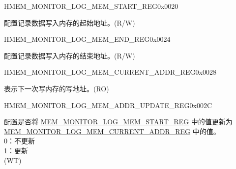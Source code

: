 \begin{register}{H}{MEM\_MONITOR\_LOG\_MEM\_START\_REG}{0x0020}\label{regdesc:MEMMONITORLOGMEMSTARTREG}
%
\regnewline%
\begin{regdesc}\begin{reglist}
\label{fielddesc:MEMMONITORLOGMEMSTART}\item [MEM\_MONITOR\_LOG\_MEM\_START] 配置记录数据写入内存的起始地址。(R/W)
\end{reglist}\end{regdesc}
\end{register}


\begin{register}{H}{MEM\_MONITOR\_LOG\_MEM\_END\_REG}{0x0024}\label{regdesc:MEMMONITORLOGMEMENDREG}
%
\regnewline%
\begin{regdesc}\begin{reglist}
\label{fielddesc:MEMMONITORLOGMEMEND}\item [MEM\_MONITOR\_LOG\_MEM\_END] 配置记录数据写入内存的结束地址。(R/W)
\end{reglist}\end{regdesc}
\end{register}


\begin{register}{H}{MEM\_MONITOR\_LOG\_MEM\_CURRENT\_ADDR\_REG}{0x0028}\label{regdesc:MEMMONITORLOGMEMCURRENTADDRREG}
%
\regnewline%
\begin{regdesc}\begin{reglist}
\label{fielddesc:MEMMONITORLOGMEMCURRENTADDR}\item [MEM\_MONITOR\_LOG\_MEM\_CURRENT\_ADDR] 表示下一次写内存的写地址。(RO)
\end{reglist}\end{regdesc}
\end{register}


\begin{register}{H}{MEM\_MONITOR\_LOG\_MEM\_ADDR\_UPDATE\_REG}{0x002C}\label{regdesc:MEMMONITORLOGMEMADDRUPDATEREG}
%
%
\regnewline%
\begin{regdesc}\begin{reglist}
\label{fielddesc:MEMMONITORLOGMEMADDRUPDATE}\item [MEM\_MONITOR\_LOG\_MEM\_ADDR\_UPDATE] 配置是否将 \hyperref[regdesc:MEMMONITORLOGMEMSTARTREG]{MEM\_MONITOR\_LOG\_MEM\_START\_REG} 中的值更新为 \hyperref[regdesc:MEMMONITORLOGMEMCURRENTADDRREG]{MEM\_MONITOR\_LOG\_MEM\_CURRENT\_ADDR\_REG} 中的值。\\
0：不更新\\
1：更新\\
(WT)
\end{reglist}\end{regdesc}
\end{register}


